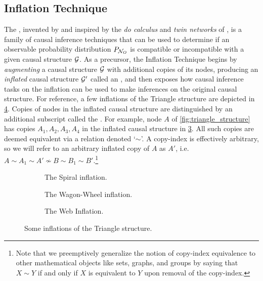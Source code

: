 \documentclass[aps, 10pt, english, twoside, pra, nofootinbib, tightenlines, longbibliography, superscriptaddress]{revtex4-1}
\begin{document}
    \subsection{Inflation Technique}
    \label{sec:deriving_inequalities}
    \label{sec:main_appendix_main_summary}
    The , invented by \citet{Inflation} and inspired by the \textit{do calculus} and \textit{twin networks} of \citet{Pearl_2009}, is a family of causal inference techniques that can be used to determine if an observable probability distribution $\prob[\nodes_{O}]$ is compatible or incompatible with a given causal structure $\mathcal{G}$. As a precursor, the Inflation Technique begins by \textit{augmenting} a causal structure $\mathcal{G}$ with additional copies of its nodes, producing an \textit{inflated} causal structure $\mathcal{G}'$ called an , and then exposes how causal inference tasks on the inflation can be used to make inferences on the original causal structure. For reference, a few inflations of the Triangle structure are depicted in \cref{fig:inflations}. Copies of nodes in the inflated causal structure are distinguished by an additional subscript called the . For example, node $A$ of \cref{fig:triangle_structure} has copies $A_1, A_2, A_3, A_4$ in the inflated causal structure in \cref{fig:the_web_inflation}. All such copies are deemed equivalent via a  relation denoted `$\sim$'. A copy-index is effectively arbitrary, so we will refer to an arbitrary inflated copy of $A$ as $A'$, i.e. $A \sim A_1 \sim A' \not\sim B \sim B_1 \sim B'$.\footnote{Note that we preemptively generalize the notion of copy-index equivalence to other mathematical objects like sets, graphs, and groups by saying that $X \sim Y$ if and only if $X$ is equivalent to $Y$ upon removal of the copy-index.}

    \begin{nscenter}
    \begin{figure}
    \begin{subfigure}[b]{.30\linewidth}
    \scalebox{0.65}{}
    \caption{The Spiral inflation.}\label{fig:spiral_inflation}
    \end{subfigure}
    \begin{subfigure}[b]{.30\linewidth}
    \scalebox{0.65}{}
    \caption{The Wagon-Wheel inflation.}\label{fig:wagon_wheel_inflation}
    \end{subfigure}
    \begin{subfigure}[b]{.30\linewidth}
    \scalebox{0.65}{}
    \caption{The Web Inflation.}\label{fig:the_web_inflation}
    \end{subfigure}
    \caption{Some inflations of the Triangle structure.}
    \label{fig:inflations}
    \end{figure}
    \end{nscenter}
\end{document}
